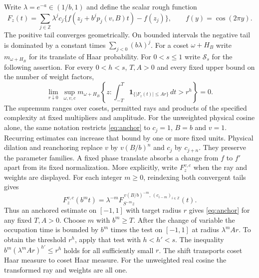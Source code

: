 \documentclass[11pt,a4paper]{article}
\begin{document}
Write $\lambda=e^{-a}\in(1/b,1)$ and define the scalar rough function
\begin{equation}\label{eq:increment}
 F_z(t)=\sum_{j\in\mathbb Z}\lambda^jc_j
   \{f(z_j+b^jp_j(v,B)t)-f(z_j)\},\qquad f(y)=\cos(2\pi y).
\end{equation}
The positive tail converges geometrically. On bounded intervals the
negative tail is dominated by a constant times $\sum_{j<0}(b\lambda)^j$.
For a coset $\omega+H_B$ write $m_{\omega+H_B}$ for its translate of
Haar probability. For $0<s\le1$ write $\mathcal S_s$ for the following
assertion. For every $0<h<s$, $T,A>0$ and every fixed upper bound on
the number of weight factors,
\begin{equation}\label{eq:anchor}
 \lim_{r\downarrow0}\ \sup_{\omega,v,c}
 m_{\omega+H_B}\!\left\{z:\int_{-T}^{T}
       \mathbf{1}_{\{|F_z(t)|\le Ar\}}\,dt>r^h\right\}=0.
\end{equation}
The supremum ranges over cosets, permitted rays and products of the
specified complexity at fixed multipliers and amplitude. For the
unweighted physical cosine alone, the same notation restricts
\eqref{eq:anchor} to $c_j=1$, $B=b$ and $v=1$. Recurring estimates
can increase that bound by one or more fixed units. Physical dilation
and reanchoring replace $v$ by $v(B/b)^n$ and $c_j$ by $c_{j+n}$.
They preserve the parameter families. A fixed phase translate absorbs
a change from $f$ to $f'$ apart from its fixed normalization.
More explicitly, write $F_z^{v,c}$ when the ray and weights are displayed.
For each integer $m\ge0$, reindexing both convergent tails gives
\begin{equation}\label{eq:fixed-dilation}
 F_z^{v,c}(b^m t)=\lambda^{-m}
 F_{S^{-m}z}^{\,v(B/b)^{-m},\, (c_{i-m})_{i\in\mathbb Z}}(t).
\end{equation}
Thus an anchored estimate on $[-1,1]$ with target radius $r$ gives
\eqref{eq:anchor} for any fixed $T,A>0$. Choose $m$ with $b^m\ge T$.
After the change of variable the occupation time is bounded by $b^m$
times the test on $[-1,1]$ at radius $\lambda^m Ar$. To obtain the
threshold $r^h$, apply that test with $h<h'<s$. The inequality
$b^m(\lambda^m Ar)^{h'}\le r^h$ holds for all sufficiently small $r$.
The shift transports coset Haar measure to coset Haar measure. For the
unweighted real cosine the transformed ray and weights are all one.
\end{document}
